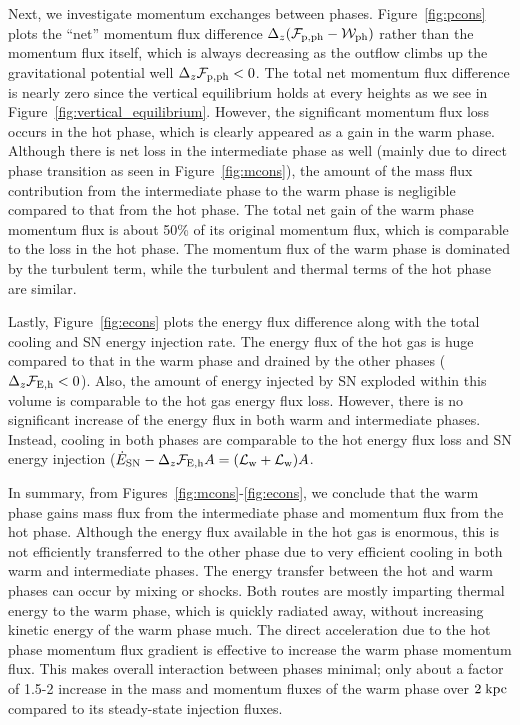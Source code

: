 \documentclass[twocolumn]{aastex62}
\newcommand\kpc{\;{\rm kpc}}
\begin{document}
Next, we investigate momentum exchanges between phases. Figure~\ref{fig:pcons} plots the ``net'' momentum flux difference $\Delta_z(\mathcal{F}_{\rm p, ph} - \mathcal{W}_{\rm ph})$ rather than the momentum flux itself, which is always decreasing as the outflow climbs up the gravitational potential well $\Delta_z\mathcal{F}_{\rm p,ph} < 0$. The total net momentum flux difference is nearly zero since the vertical equilibrium holds at every heights as we see in Figure~\ref{fig:vertical_equilibrium}. However, the significant momentum flux loss occurs in the hot phase, which is clearly appeared as a gain in the warm phase. Although there is net loss in the intermediate phase as well (mainly due to direct phase transition as seen in Figure~\ref{fig:mcons}), the amount of the mass flux contribution from the intermediate phase to the warm phase is negligible compared to that from the hot phase. 
The total net gain of the warm phase momentum flux is about 50\% of its original momentum flux, which is comparable to the loss in the hot phase. The momentum flux of the warm phase is dominated by the turbulent term, while the turbulent and thermal terms of the hot phase are similar.

Lastly, Figure~\ref{fig:econs} plots the energy flux difference along with the total cooling and SN energy injection rate. The energy flux of the hot gas is huge compared to that in the warm phase and drained by the other phases ($\Delta_z \mathcal{F}_{\rm E,h}<0$). Also, the amount of energy injected by SN exploded within this volume is comparable to the hot gas energy flux loss. However, there is no significant increase of the energy flux in both warm and intermediate phases. Instead, cooling in both phases are comparable to the hot energy flux loss and SN energy injection ($\dot{E}_{\rm SN}-\Delta_z \mathcal{F}_{\rm E,h}A = (\mathcal{L}_{\rm w}+\mathcal{L}_{\rm w})A$.

In summary, from Figures~\ref{fig:mcons}-\ref{fig:econs}, we conclude that the warm phase gains mass flux from the intermediate phase and momentum flux from the hot phase. Although the energy flux available in the hot gas is enormous, this is not efficiently transferred to the other phase due to very efficient cooling in both warm and intermediate phases. The energy transfer between the hot and warm phases can occur by mixing or shocks. Both routes are mostly imparting thermal energy to the warm phase, which is quickly radiated away, without increasing kinetic energy of the warm phase much. The direct acceleration due to the hot phase momentum flux gradient is effective to increase the warm phase momentum flux. This makes overall interaction between phases minimal; only about a factor of 1.5-2 increase in the mass and momentum fluxes of the warm phase over $2\kpc$ compared to its steady-state injection fluxes.
\end{document}
